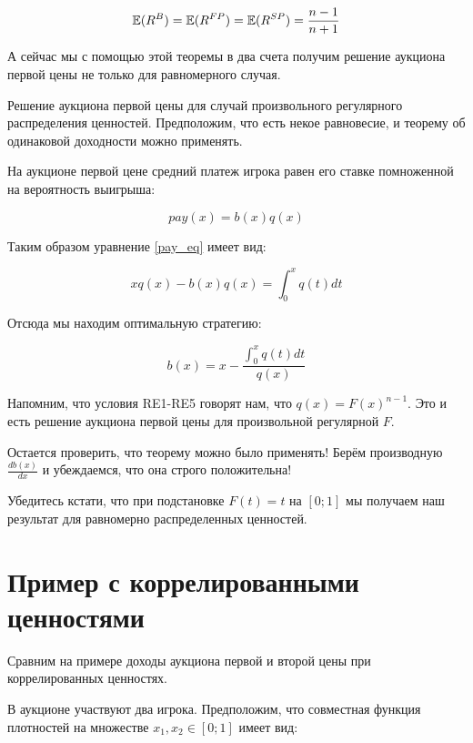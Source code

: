 \begin{equation}
\mathbb{E}(R^{B})=\mathbb{E}(R^{FP})=\mathbb{E}(R^{SP})=\frac{n-1}{n+1}
\end{equation}


А сейчас мы с помощью этой теоремы в два счета получим решение аукциона первой цены не только для равномерного случая.


\begin{myex} \label{use_ret} Решение аукциона первой цены для случай произвольного регулярного распределения ценностей. Предположим, что есть некое равновесие, и теорему об одинаковой доходности можно применять.

На аукционе первой цене средний платеж игрока равен его ставке помноженной на вероятность выигрыша:

\begin{equation}
\label{first_price_pay_eq}
pay(x)=b(x)q(x)
\end{equation}

Таким образом уравнение \ref{pay_eq} имеет вид:

\begin{equation}
xq(x)-b(x)q(x)=\int_{0}^{x}q(t)dt
\end{equation}

Отсюда мы находим оптимальную стратегию:

\begin{equation}
\label{first_price_b_eq}
b(x)=x-\frac{\int_{0}^{x}q(t)dt}{q(x)}
\end{equation}

Напомним, что условия RE1-RE5 говорят нам, что $ q(x)=F(x)^{n-1} $. Это и есть решение аукциона первой цены для произвольной регулярной $ F $.

Остается проверить, что теорему можно было применять! Берём производную $ \frac{db(x)}{dx} $ и убеждаемся, что она строго положительна!

Убедитесь кстати, что при подстановке $ F(t)=t $ на $ [0;1] $ мы получаем наш результат для равномерно распределенных ценностей.
\end{myex}




\section{Пример с коррелированными ценностями}


Сравним на примере доходы аукциона первой и второй цены при коррелированных ценностях.

В аукционе участвуют два игрока. Предположим, что совместная функция плотностей на множестве $ x_{1},x_{2}\in [0;1] $ имеет вид:

